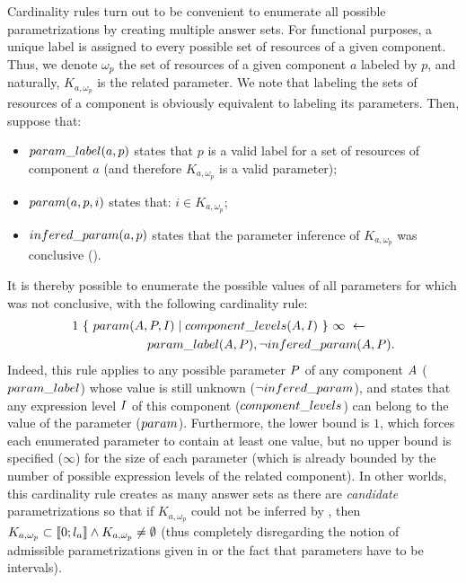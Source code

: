 Cardinality rules turn out to be convenient to enumerate all possible parametrizations by creating multiple answer sets.
For functional purposes, a unique label is assigned to every possible set of resources of a given component.
Thus, we denote $\omega_p$ the set of resources of a given component $a$ labeled by $p$,
and naturally, $K_{a,\omega_p}$ is the related parameter.
We note that labeling the sets of resources of a component is obviously equivalent to labeling its parameters.
Then, suppose that:
\begin{itemize}
  \item $param\_label(a, p)$ states that $p$ is a valid label for a set of resources of component $a$ (and therefore $K_{a,\omega_p}$ is a valid parameter);
  \item $param(a, p, i)$ states that: $i \in K_{a, \omega_p}$;
  \item $infered\_param(a, p)$ states that the parameter inference of $K_{a, \omega_p}$ was conclusive ().
\end{itemize}
It is thereby possible to enumerate the possible values of all parameters for which  was not conclusive, with the following cardinality rule:
\begin{align*}
  & 1\ \{\ param(A, P, I) \mid component\_levels(A, I)\ \}\ \infty\ \leftarrow \\
  & \qquad\qquad\qquad param\_label(A, P), \neg infered\_param(A, P).
\end{align*}
Indeed, this rule applies to any possible parameter $P$ of any component $A$ ($param\_label$) whose value is still unknown ($\neg infered\_param$),
and states that any expression level $I$ of this component ($component\_levels$) can belong to the value of the parameter ($param$).
Furthermore, the lower bound is $1$, which forces each enumerated parameter to contain at least one value,
but no upper bound is specified ($\infty$) for the size of each parameter
(which is already bounded by the number of possible expression levels of the related component).
In other worlds, this cardinality rule creates as many answer sets as there are \emph{candidate} parametrizations
so that if $K_{a, \omega_p}$ could not be inferred by , then
$K_{a, \omega_p} \subset \llbracket 0 ; l_a \rrbracket \wedge K_{a, \omega_p} \neq \emptyset$
(thus completely disregarding the notion of admissible parametrizations given in  or the fact that parameters have to be intervals).


